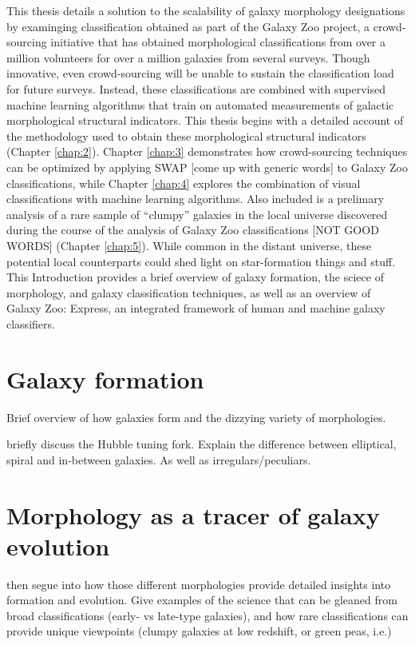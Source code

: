 This thesis details a solution to the scalability of galaxy morphology designations by examinging classification obtained as part of the Galaxy Zoo project, a crowd-sourcing initiative that has obtained morphological classifications from over a million volunteers for over a million galaxies from several surveys. Though innovative, even crowd-sourcing will be unable to sustain the classification load for future surveys. Instead, these classifications are combined with supervised machine learning algorithms that train on automated measurements of galactic morphological structural indicators. This thesis begins with a detailed account of the methodology used to obtain these morphological structural indicators (Chapter \ref{chap:2}). Chapter \ref{chap:3} demonstrates how crowd-sourcing techniques can be optimized by applying SWAP [come up with generic words] to Galaxy Zoo classifications, while Chapter \ref{chap:4} explores the combination of visual classifications with machine learning algorithms. Also included is a prelimary analysis of a rare sample of ``clumpy'' galaxies in the local universe discovered during the course of the analysis of Galaxy Zoo classifications [NOT GOOD WORDS] (Chapter \ref{chap:5}). While common in the distant universe, these potential local counterparts could shed light on  star-formation things and stuff. This Introduction provides a brief overview of galaxy formation, the sciece of morphology, and galaxy classification techniques, as well as an overview of Galaxy Zoo: Express, an integrated framework of human and machine galaxy classifiers. 




\section{Galaxy formation}
Brief overview of how galaxies form and the dizzying variety of morphologies. 


briefly discuss the Hubble tuning fork. Explain the difference between elliptical, spiral and in-between galaxies. As well as irregulars/peculiars. 


\section{Morphology as a tracer of galaxy evolution}
then segue into how those different morphologies provide detailed insights into formation and evolution. Give examples of the science that can be gleaned from broad classifications (early- vs late-type galaxies), and how rare classifications can provide unique viewpoints (clumpy galaxies at low redshift, or green peas, i.e.)

